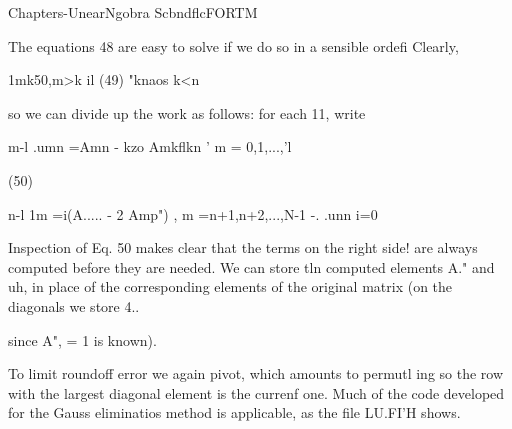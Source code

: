 Chapters-UnearNgobra ScbndflcFORTM

The equations 48 are easy to solve if we do so in a sensible ordefi
Clearly,

1mk50,m>k il
(49)
"knaos k<n

so we can divide up the work as follows: for each 11, write

 

 

m-l
.umn =Amn - kzo Amkflkn ' m = 0,1,...,'l

(50)

n-l
1m =i(A..... - 2 Amp") , m =n+1,n+2,...,N-1 -.
.unn i=0

 

Inspection of Eq. 50 makes clear that the terms on the right side!
are always computed before they are needed. We can store tln
computed elements A." and uh, in place of the corresponding
elements of the original matrix (on the diagonals we store  4..

since A", = 1 is known).

To limit roundoff error we again pivot, which amounts to permutl
ing so the row with the largest diagonal element is the currenf
one. Much of the code developed for the Gauss eliminatios
method is applicable, as the file LU.FI'H shows.

